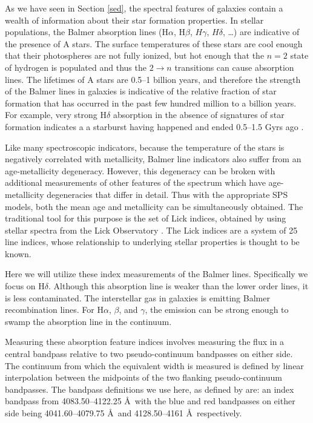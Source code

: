 As we have seen in Section \ref{sed}, the spectral features of 
galaxies contain a wealth of information about their star 
formation properties. In stellar populations, the Balmer 
absorption lines (H$\alpha$, H$\beta$, $H\gamma$, $H\delta$, \ldots)
are indicative of the presence of A stars. The surface 
temperatures of these stars are cool enough that their photospheres
are not fully ionized, but hot enough that the $n=2$ state of
hydrogen is populated and thus the $2\rightarrow n$ transitions 
can cause absorption lines. The lifetimes of A stars are 0.5--1 
billion years, and therefore the strength of the Balmer
lines in galaxies is indicative of the relative fraction of star
formation that has occurred in the past few hundred million to
a billion years. For example, very strong H$\delta$ absorption 
in the absence of signatures of star formation indicates a 
a starburst having happened and ended 0.5--1.5 Gyrs ago 
\citep{1983ApJ...270....7D}. 

Like many spectroscopic indicators,
because the temperature of the stars is negatively correlated 
with metallicity, Balmer line indicators also suffer from an
age-metallicity degeneracy. However, this degeneracy can be 
broken with additional measurements of other features of the 
spectrum which have age-metallicity degeneracies that differ
in detail. Thus with the appropriate SPS models, both the 
mean age and metallicity can be simultaneously obtained. 
The traditional tool for this purpose is the set of Lick indices, 
obtained by using stellar spectra from the Lick Observatory 
\citep{1997ApJS..111..377W, worthey_comprehensive_1994}. The 
Lick indices are a system of 25 line indices, whose 
relationship to underlying stellar properties is thought
to be known. 

Here we will utilize these index measurements of the Balmer 
lines. Specifically we focus on H$\delta$. Although this absorption
line is weaker than the lower order lines, it is less contaminated.
The interstellar gas in galaxies is emitting Balmer recombination
lines. For H$\alpha$, $\beta$, and $\gamma$, the emission can 
be strong enough to swamp the absorption line in the 
continuum. 

Measuring these absorption feature indices involves measuring 
the flux in a central bandpass relative to two pseudo-continuum 
bandpasses on either side. The continuum from 
which the equivalent width is measured is defined by linear
interpolation between the midpoints  of the two flanking pseudo-continuum 
bandpasses. The bandpass definitions we use here, as defined 
by \citet{worthey_comprehensive_1994} are: an index bandpass from 
4083.50--4122.25 \AA\ with the blue and red bandpasses on either side 
being 4041.60--4079.75 \AA\ and 4128.50--4161 \AA\ respectively.

